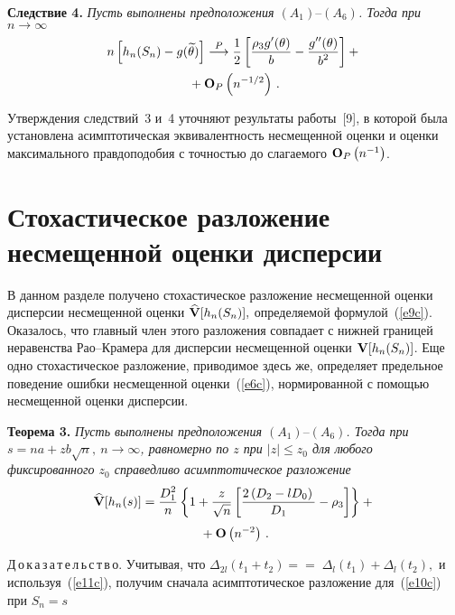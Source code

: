 \begin{multicols}{2}
\medskip

\noindent
{\bf Следствие 4.} {\it Пусть выполнены предположения
    $(A_1)\mbox{--}(A_6)$. Тогда при $ n\rightarrow\infty$ }
   \begin{multline*} 
n\left[h_n(S_n)-g(\widetilde{\theta}) \right]
   \stackrel {P}{\longrightarrow} \displaystyle\frac{\displaystyle 1\mathstrut}{\displaystyle 2\mathstrut}
    \left[\displaystyle\frac{\displaystyle \rho_3g'(\theta)\mathstrut}{\displaystyle b\mathstrut}-\displaystyle\frac{\displaystyle g''(\theta)\mathstrut}{\displaystyle b^2\mathstrut}
    \right]+{}\\
    {}+{\bf O}_P\left(n^{-1/2}\right)\,.
   \end{multline*}

\smallskip

Утверждения следствий~3 и~4 уточняют результаты работы~[9],
   в которой была установлена асимптотическая эквивалентность
   несмещенной оценки и оценки максимального правдоподобия с точностью
   до слагаемого ${\bf O}_P\left( n^{-1}\right)$.

  \section{Стохастическое разложение несмещенной оценки дисперсии}

   В данном разделе получено стохастическое разложение несмещенной
   оценки дисперсии не\-смещенной оценки $\widehat{\bf {V}}[h_n(S_n)],$
   определяемой фор\-мулой~(\ref{e9c}). Оказалось, что главный член этого
   разложения совпадает с нижней границей неравенства Рао--Крамера
   для дисперсии несмещенной оценки ${\bf {V}}[h_n(S_n)]$. Еще
   одно стохастическое разложение, приводимое здесь же,
   определяет предельное поведение
   ошибки несмещенной оценки~(\ref{e6c}), нормированной с помощью
   несмещенной оценки дис\-персии. 

\medskip

\noindent
{\bf Теорема 3.} {\it  Пусть выполнены предположения
  $(A_1)\mbox{--}(A_6)$. Тогда при 
$s=na+z b\sqrt{n},~n\rightarrow\infty$,
равномерно по $z$ при $|z|\le z_0$ для любого фиксированного $z_0$
  справедливо асимптотическое разложение
  \begin{multline*} 
\widehat{\bf {V}}[h_n(s)]=\displaystyle\frac{\displaystyle D_1^2\mathstrut}{\displaystyle n\mathstrut}
     \left\{1+\displaystyle\frac{\displaystyle z\mathstrut}{\displaystyle \sqrt{n}\mathstrut}
     \left[ \displaystyle\frac{\displaystyle 2\left(D_2-lD_0 \right)\mathstrut}{\displaystyle D_1\mathstrut}-\rho_3\right]
      \right\}+{}\\[3pt]
      {}+{\bf O}\left(n^{-2}\right)\,.
  \end{multline*}
   }

\smallskip


\noindent
Д\,о\,к\,а\,з\,а\,т\,е\,л\,ь\,с\,т\,в\,о. Учитывая, что
  $ \Delta_{2l}(t_1+t_2)=$\linebreak $=\;\Delta_l(t_1)+\Delta_l(t_2),$
  и используя~(\ref{e11c}), получим сначала
  асимптотическое разложение для~(\ref{e10c}) при $S_n=s$


\end{multicols}
